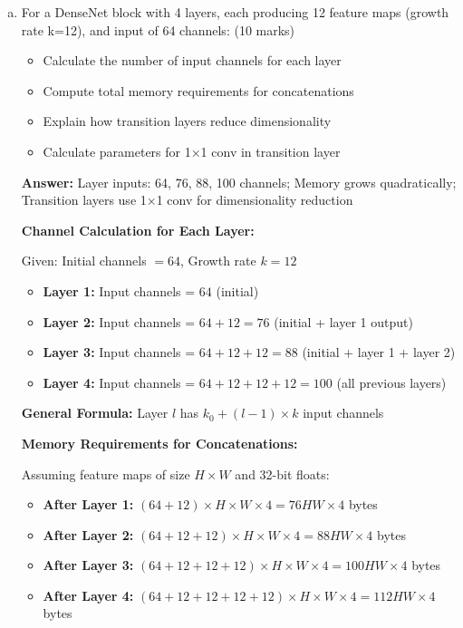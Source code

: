 \documentclass[12pt]{article}
\newcommand{\answer}[1]{{\color{answercolor}\textbf{Answer:} #1}}
\newcommand{\explanation}[1]{{\color{explanationcolor}#1}}
\begin{document}
\begin{enumerate}[(a)]
    \item For a DenseNet block with 4 layers, each producing 12 feature maps (growth rate k=12), and input of 64 channels: \hfill (10 marks)
    \begin{itemize}
        \item Calculate the number of input channels for each layer
        \item Compute total memory requirements for concatenations
        \item Explain how transition layers reduce dimensionality
        \item Calculate parameters for 1×1 conv in transition layer
    \end{itemize}
    
    \answer{Layer inputs: 64, 76, 88, 100 channels; Memory grows quadratically; Transition layers use 1×1 conv for dimensionality reduction}
    
    \explanation{
    \textbf{Channel Calculation for Each Layer:}
    
    Given: Initial channels $= 64$, Growth rate $k = 12$
    
    \begin{itemize}
        \item \textbf{Layer 1:} Input channels = $64$ (initial)
        \item \textbf{Layer 2:} Input channels = $64 + 12 = 76$ (initial + layer 1 output)
        \item \textbf{Layer 3:} Input channels = $64 + 12 + 12 = 88$ (initial + layer 1 + layer 2)
        \item \textbf{Layer 4:} Input channels = $64 + 12 + 12 + 12 = 100$ (all previous layers)
    \end{itemize}
    
    \textbf{General Formula:} Layer $l$ has $k_0 + (l-1) \times k$ input channels
    
    \textbf{Memory Requirements for Concatenations:}
    
    Assuming feature maps of size $H \times W$ and 32-bit floats:
    \begin{itemize}
        \item \textbf{After Layer 1:} $(64 + 12) \times H \times W \times 4 = 76HW \times 4$ bytes
        \item \textbf{After Layer 2:} $(64 + 12 + 12) \times H \times W \times 4 = 88HW \times 4$ bytes
        \item \textbf{After Layer 3:} $(64 + 12 + 12 + 12) \times H \times W \times 4 = 100HW \times 4$ bytes
        \item \textbf{After Layer 4:} $(64 + 12 + 12 + 12 + 12) \times H \times W \times 4 = 112HW \times 4$ bytes
    \end{itemize}
    
}
\end{enumerate}
\end{document}
